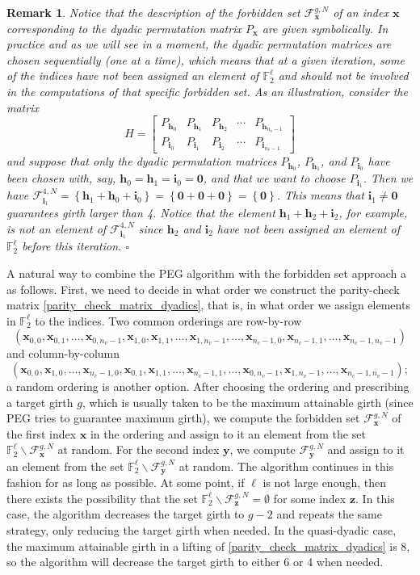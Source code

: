 \documentclass[11pt]{article}
\theoremstyle{plain}
\theoremstyle{plain}
\newtheorem{PreRemark}[lemma]{{\textbf{Remark}}}
\newenvironment{remark}%
    {\begin{PreRemark}\upshape}{\hfill$\square$\end{PreRemark}}
\theoremstyle{definition}
\numberwithin{theo}{section}
\newcommand{\bzero}{\mathbf{0}}
\newcommand{\bh}{{\mathbf h}}
\newcommand{\bi}{{\mathbf i}}
\newcommand{\bx}{{\mathbf x}}
\newcommand{\by}{{\mathbf y}}
\newcommand{\bz}{{\mathbf z}}
\def\matrix#1{\begin{bmatrix}#1\end{bmatrix}} %
\newcounter{ara}
\newcounter{rom}
\begin{document}
\begin{remark}
Notice that the description of the forbidden set $\mathcal{F}_{\bx}^{g,N}$ of an index $\bx$ corresponding to the dyadic permutation matrix $P_{\bx}$
are given symbolically. In practice and as we will see in a moment, the dyadic permutation matrices are chosen sequentially (one at a time), which means that at a given iteration, some of the indices have not been assigned an element of $\mathbb{F}_2^\ell$ and should not be involved in the computations of that specific forbidden set. As an illustration, 
consider the matrix
\begin{equation*}
H = \matrix{P_{\bh_{0}}&P_{\bh_{1}}&P_{\bh_{2}}&\cdots&P_{\bh_{n_v-1}} \\ P_{\bi_{0}}&P_{\bi_{1}}&P_{\bi_{2}}&\cdots&P_{\bi_{n_v-1}} 
}
\end{equation*}
and suppose that only the dyadic permutation matrices $P_{\bh_0}$, $P_{\bh_1}$, and $P_{\bi_0}$ have been chosen with, say, $\bh_0=\bh_1=\bi_0=\bzero$, and that we want to choose $P_{\bi_1}$. Then we have $\mathcal{F}_{\bi_1}^{4,N}=\left\{\bh_1+\bh_0+\bi_0\right\}=\left\{\bzero+\bzero+\bzero\right\}=\left\{\bzero\right\}$. This means that $\bi_1\neq\bzero$ guarantees girth larger than 4. Notice that the element $\bh_1+\bh_2+\bi_2$, for example, is not an element of $\mathcal{F}_{\bi_1}^{4,N}$ since $\bh_2$ and $\bi_2$ have not been assigned an element of $\mathbb{F}_2^\ell$ before this iteration. 
\end{remark}

A natural way to combine the PEG algorithm with the forbidden set approach a as follows. First, we need to decide in what order we construct the parity-check matrix \eqref{parity_check_matrix_dyadics}, that is, in what order we assign elements in $\mathbb{F}_2^\ell$ to the indices. Two common orderings are row-by-row \[(\bx_{0,0},\bx_{0,1},\dots,\bx_{0,n_v-1},\bx_{1,0},\bx_{1,1},\dots,\bx_{1,n_v-1},\dots,\bx_{n_c-1,0},\bx_{n_c-1,1},\dots,\bx_{n_c-1,n_v-1})\] and column-by-column \[(\bx_{0,0},\bx_{1,0},\dots,\bx_{n_c-1,0},\bx_{0,1},\bx_{1,1},\dots,\bx_{n_c-1,1},\dots,\bx_{0,n_v-1},\bx_{1,n_v-1},\dots,\bx_{n_c-1,n_v-1});\] a random ordering is another option. After choosing the ordering and prescribing a target girth $g$, which is usually taken to be the maximum attainable girth (since PEG tries to guarantee maximum girth), we compute the forbidden set $\mathcal{F}_{\bx}^{g,N}$ of the first index $\bx$ in the ordering and assign to it an element from the set $\mathbb{F}_2^\ell\backslash\mathcal{F}_{\bx}^{g,N}$ at random. For the second index $\by$, we compute $\mathcal{F}_{\by}^{g,N}$ and assign to it an element from the set $\mathbb{F}_2^\ell\backslash\mathcal{F}_{\by}^{g,N}$ at random. The algorithm continues in this fashion for as long as possible. At some point, if $\ell$ is not large enough, then there exists the possibility that the set $\mathbb{F}_2^\ell\backslash\mathcal{F}_{\bz}^{g,N}=\emptyset$ for some index $\bz$. In this case, the algorithm decreases the target girth to $g-2$ and repeats the same strategy, only reducing the target girth when needed. In the quasi-dyadic case, the maximum attainable girth in a lifting of \eqref{parity_check_matrix_dyadics} is 8, so the algorithm will decrease the target girth to either 6 or 4 when needed.
\end{document}
